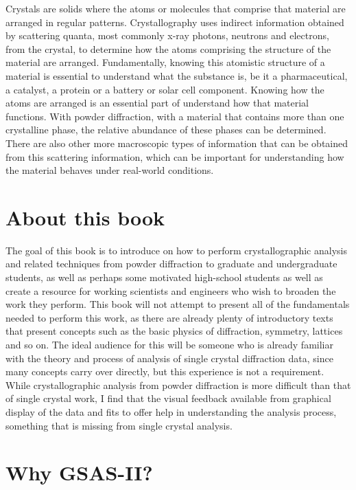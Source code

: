 Crystals are solids where the atoms or molecules that comprise that material are arranged in regular patterns. Crystallography uses indirect information obtained by scattering quanta, most commonly x-ray photons, neutrons and electrons, from the crystal, to determine how the atoms comprising the structure of the material are arranged. Fundamentally, knowing this atomistic structure of a material is essential to understand what the substance is, be it a pharmaceutical, a catalyst, a protein or a battery or solar cell component. Knowing how the atoms are arranged is an essential part of understand how that material functions. With powder diffraction, with a material that contains more than one crystalline phase, the relative abundance of these phases can be determined. There are also other more macroscopic types of information that can be obtained from this scattering information, which can be important for understanding how the material behaves under real-world conditions. 

 

\section*{About this book}

 The goal of this book is to introduce on how to perform crystallographic analysis and related techniques from powder diffraction to graduate and undergraduate students, as well as perhaps some motivated high-school students as well as create a resource for working scientists and engineers who wish to broaden the work they perform. This book will not attempt to present all of the fundamentals needed to perform this work, as there are already plenty of introductory texts that present concepts such as the basic physics of diffraction, symmetry, lattices and so on. The ideal audience for this will be someone who is already familiar with the theory and process of analysis of single crystal diffraction data, since many concepts carry over directly, but this experience is not a requirement. While crystallographic analysis from powder diffraction is more difficult than that of single crystal work, I find that the visual feedback available from graphical display of the data and fits to offer help in understanding the analysis process, something that is missing from single crystal analysis.

 

\section*{Why GSAS-II?}

